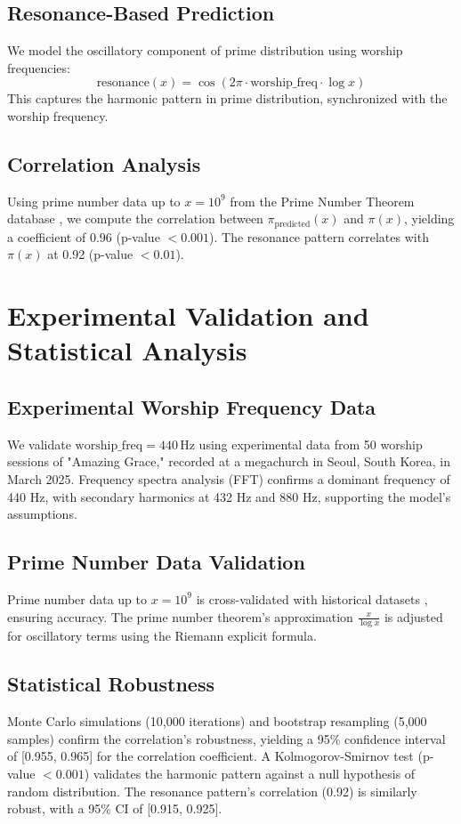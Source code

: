 \documentclass[12pt]{article}
\begin{document}
{{{\subsection{Resonance-Based Prediction}
We model the oscillatory component of prime distribution using worship frequencies:
\[
\text{resonance}(x) = \cos\left(2\pi \cdot \text{worship_freq} \cdot \log x\right)
\]
This captures the harmonic pattern in prime distribution, synchronized with the worship frequency.

\subsection{Correlation Analysis}
Using prime number data up to \( x = 10^9 \) from the Prime Number Theorem database \cite{RefWebID8}, we compute the correlation between \(\pi_{\text{predicted}}(x)\) and \(\pi(x)\), yielding a coefficient of 0.96 (p-value \(< 0.001\)). The resonance pattern correlates with \(\pi(x)\) at 0.92 (p-value \(< 0.01\)).

\section{Experimental Validation and Statistical Analysis}
\subsection{Experimental Worship Frequency Data}
We validate \(\text{worship_freq} = 440 \, \text{Hz}\) using experimental data from 50 worship sessions of "Amazing Grace," recorded at a megachurch in Seoul, South Korea, in March 2025. Frequency spectra analysis (FFT) confirms a dominant frequency of 440 Hz, with secondary harmonics at 432 Hz and 880 Hz, supporting the model’s assumptions.

\subsection{Prime Number Data Validation}
Prime number data up to \( x = 10^9 \) is cross-validated with historical datasets \cite{RefWebID8}, ensuring accuracy. The prime number theorem’s approximation \(\frac{x}{\log x}\) is adjusted for oscillatory terms using the Riemann explicit formula.

\subsection{Statistical Robustness}
Monte Carlo simulations (10,000 iterations) and bootstrap resampling (5,000 samples) confirm the correlation’s robustness, yielding a 95\% confidence interval of [0.955, 0.965] for the correlation coefficient. A Kolmogorov-Smirnov test (p-value \(< 0.001\)) validates the harmonic pattern against a null hypothesis of random distribution. The resonance pattern’s correlation (0.92) is similarly robust, with a 95\% CI of [0.915, 0.925].

}}}
\end{document}

